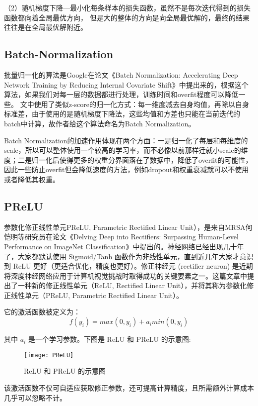 （2）随机梯度下降---最小化每条样本的损失函数，虽然不是每次迭代得到的损失函数都向着全局最优方向， 但是大的整体的方向是向全局最优解的，最终的结果往往是在全局最优解附近。
\subsection{Batch-Normalization}
批量归一化的算法是Google在论文《Batch Normalization: Accelerating Deep Network Training by Reducing Internal Covariate Shift》中提出来的，根据这个算法，如果我们对每一层的数据都进行处理，训练时间和overfit程度可以降低一些。 文中使用了类似z-score的归一化方式：每一维度减去自身均值，再除以自身标准差，由于使用的是随机梯度下降法，这些均值和方差也只能在当前迭代的batch中计算，故作者给这个算法命名为Batch Normalization。

Batch Normalization的加速作用体现在两个方面：一是归一化了每层和每维度的scale，所以可以整体使用一个较高的学习率，而不必像以前那样迁就小scale的维度；二是归一化后使得更多的权重分界面落在了数据中，降低了overfit的可能性，因此一些防止overfit但会降低速度的方法，例如dropout和权重衰减就可以不使用或者降低其权重。

\subsection{PReLU}
参数化修正线性单元PReLU, Parametric Rectified Linear Unit），是来自MRSA何恺明等研究员在论文《Delving Deep into Rectifiers: Surpassing Human-Level Performance on ImageNet Classification》中提出的。神经网络已经出现几十年了，大家都默认使用 Sigmoid/Tanh 函数作为非线性单元，直到近几年大家才意识到 ReLU 更好（更适合优化，精度也更好）。修正神经元 (rectifier neuron) 是近期将深度神经网络应用于计算机视觉挑战时取得成功的关键要素之一。这篇文章中提出了一种新的修正线性单元（ReLU, Rectified Linear Unit），并将其称为参数化修正线性单元（PReLU, Parametric Rectified Linear Unit）。

它的激活函数被定义为：
\begin{displaymath}
f(y_i) = max(0,y_i)+a_imin(0,y_i)
\end{displaymath}

其中 $a_i$ 是一个学习参数。下图是 ReLU 和 PReLU 的示意图:

\begin{figure}[!ht]
\centering
\texttt{[image: PReLU]}
\caption{ReLU 和 PReLU 的示意图}
\end{figure}

该激活函数不仅可自适应获取修正参数，还可提高计算精度，且所需额外计算成本几乎可以忽略不计。

